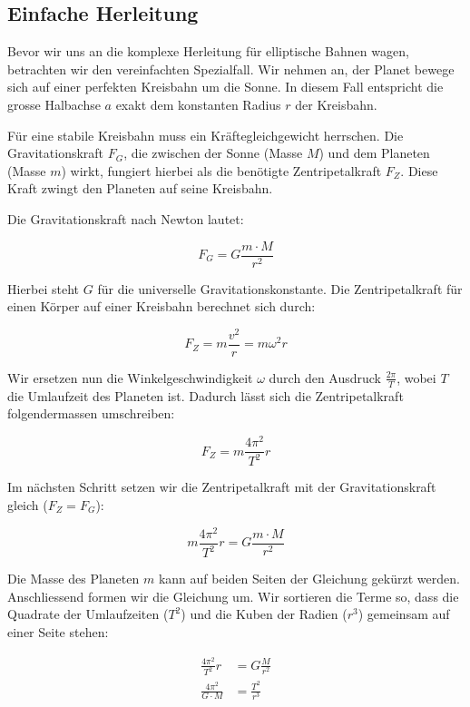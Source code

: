 
\subsection{Einfache Herleitung}
Bevor wir uns an die komplexe Herleitung für elliptische Bahnen wagen, betrachten wir den vereinfachten Spezialfall.
Wir nehmen an, der Planet bewege sich auf einer perfekten Kreisbahn um die Sonne.
In diesem Fall entspricht die grosse Halbachse $a$ exakt dem konstanten Radius $r$ der Kreisbahn.

Für eine stabile Kreisbahn muss ein Kräftegleichgewicht herrschen.
Die Gravitationskraft $F_G$, die zwischen der Sonne (Masse $M$) und dem Planeten (Masse $m$) wirkt, fungiert hierbei als die benötigte Zentripetalkraft $F_Z$.
Diese Kraft zwingt den Planeten auf seine Kreisbahn.

Die Gravitationskraft nach Newton lautet:

\begin{equation}
    F_G
    = G \frac{m \cdot M}{r^2}
\end{equation}

Hierbei steht $G$ für die universelle Gravitationskonstante.
Die Zentripetalkraft für einen Körper auf einer Kreisbahn berechnet sich durch:

\begin{equation}
    F_Z
    = m \frac{v^2}{r}
    = m \omega^2 r
\end{equation}

Wir ersetzen nun die Winkelgeschwindigkeit $\omega$ durch den Ausdruck $\frac{2\pi}{T}$, wobei $T$ die Umlaufzeit des Planeten ist.
Dadurch lässt sich die Zentripetalkraft folgendermassen umschreiben:

\begin{equation}
    F_Z
    = m \frac{4\pi^2}{T^2} r
\end{equation}

Im nächsten Schritt setzen wir die Zentripetalkraft mit der Gravitationskraft gleich ($F_Z = F_G$):

\begin{equation}
    m \frac{4\pi^2}{T^2} r
    = G \frac{m \cdot M}{r^2}
\end{equation}

Die Masse des Planeten $m$ kann auf beiden Seiten der Gleichung gekürzt werden.
Anschliessend formen wir die Gleichung um.
Wir sortieren die Terme so, dass die Quadrate der Umlaufzeiten ($T^2$) und die Kuben der Radien ($r^3$) gemeinsam auf einer Seite stehen:

\begin{align}
    \frac{4\pi^2}{T^2} r
     & = G \frac{M}{r^2}
    \\
    \frac{4\pi^2}{G \cdot M}
     & = \frac{T^2}{r^3}
\end{align}

